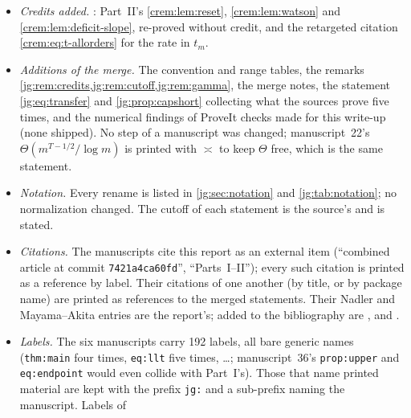 \documentclass[11pt,a4paper]{article}
\theoremstyle{definition}\newaliascnt{definition}{theorem}
\theoremstyle{remark}\newaliascnt{remark}{theorem}
\begin{document}
\begin{itemize}
 route''); manuscript~30's summary and manuscript~24's identical proof are
 replaced by merge notes. The good-subclass inequality: manuscript~33's proof;
 the four restatements with sketches are references. The squared majorant:
 manuscript~36's proof, with manuscript~33's grammar as its exact-class reading.
 Cap shortening: one statement (\cref{jg:prop:capshort}) and three routes, each
 printed in full where its regime is treated. The Gaussian theorem: three
 regimes of $H$, three proofs (\cref{jg:sec:theta-proof,jg:sec:taylor,jg:sec:window}).
 The composition estimate: manuscript~22's lemma, with manuscript~27's
 reduction as its compact-deficit case.
\item \emph{Credits added.} : Part~II's
 \cref{crem:lem:reset}, \cref{crem:lem:watson} and
 \cref{crem:lem:deficit-slope}, re-proved without credit, and the retargeted
 citation \eqref{crem:eq:t-allorders} for the rate in $t_m$.
\item \emph{Additions of the merge.} The convention and range tables, the
 remarks \cref{jg:rem:credits,jg:rem:cutoff,jg:rem:gamma}, the merge notes, the
 statement \eqref{jg:eq:transfer} and \cref{jg:prop:capshort} collecting what
 the sources prove five times, and the numerical findings of ProveIt checks
 made for this write-up (none shipped). No step of a manuscript was changed;
 manuscript~22's $\Theta(m^{T-1/2}/\log m)$ is printed with $\asymp$ to keep
 $\Theta$ free, which is the same statement.
\item \emph{Notation.} Every rename is listed in \cref{jg:sec:notation} and
 \cref{jg:tab:notation}; no normalization changed. The cutoff of each
 statement is the source's and is stated.
\item \emph{Citations.} The manuscripts cite this report as an external item
 (``combined article at commit \texttt{7421a4ca60fd}'', ``Parts~I--II''); every
 such citation is printed as a reference by label. Their citations of one
 another (by title, or by package name) are printed as references to the merged
 statements. Their Nadler and Mayama--Akita entries are the report's; added to
 the bibliography are \cite{jg:Li}, \cite{jg:FlajoletSedgewick} and
 \cite{jg:DLMF}.
\item \emph{Labels.} The six manuscripts carry 192 labels, all bare generic
 names (\texttt{thm:main} four times, \texttt{eq:llt} five times, \ldots;
 manuscript~36's \texttt{prop:upper} and \texttt{eq:endpoint} would even
 collide with Part~I's). Those that name printed material are kept with the
 prefix \texttt{jg:} and a sub-prefix naming the manuscript. Labels of

\end{itemize}
\end{document}
